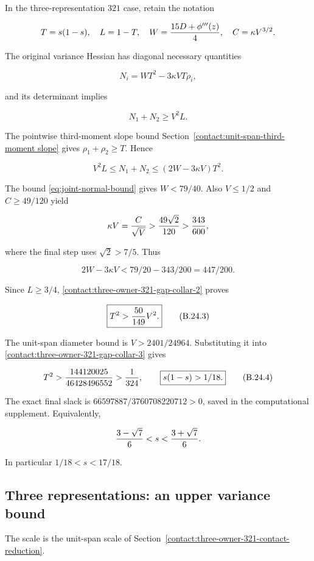 In the three-representation $321$ case, retain the notation

\[
 T=s(1-s),\quad L=1-T,\quad
 W={15D+\phi'''(z)\over4},\quad C=\kappa V^{3/2}.
\]

The original variance Hessian has diagonal necessary quantities

\[
 N_i=WT^2-3\kappa VT\rho_i,
\]

and its determinant implies

\[
 N_1+N_2\ge V^2L.
\tag{B.24.1}\label{contact:three-owner-321-gap-collar-1}
\]

The pointwise third-moment slope bound
Section~\ref{contact:unit-span-third-moment slope} gives
$\rho_1+\rho_2\ge T$. Hence

\[
 V^2L\le N_1+N_2\le(2W-3\kappa V)T^2.
\tag{B.24.2}\label{contact:three-owner-321-gap-collar-2}
\]

The bound \eqref{eq:joint-normal-bound} gives $W<79/40$. Also $V\le 1/2$
and $C\ge49/120$ yield

\[
 \kappa V={C\over\sqrt V}>{49\sqrt2\over120}>{343\over600},
\]

where the final step uses $\sqrt{2}>7/5$. Thus

\[
 2W-3\kappa V<79/20-343/200=447/200.
\]

Since $L\ge 3/4$, \eqref{contact:three-owner-321-gap-collar-2} proves

\[
 \boxed{T^2>{50\over149}V^2.}
\tag{B.24.3}\label{contact:three-owner-321-gap-collar-3}
\]

The unit-span diameter bound is $V>2401/24964$. Substituting
it into \eqref{contact:three-owner-321-gap-collar-3} gives

\[
 T^2>{144120025\over46428496552}>{1\over324},
 \qquad\boxed{s(1-s)>1/18.}
\tag{B.24.4}\label{contact:three-owner-321-gap-collar-4}
\]

The exact final slack is $66597887/3760708220712>0$, saved in
the computational supplement. Equivalently,

\[
 {3-\sqrt7\over6}<s<{3+\sqrt7\over6}.
\]

In particular $1/18<s<17/18$.
\subsection{Three representations: an upper variance bound}\label{contact:three-owner-321-variance-upper}
The scale is the unit-span scale of Section~\ref{contact:three-owner-321-contact-reduction}.



